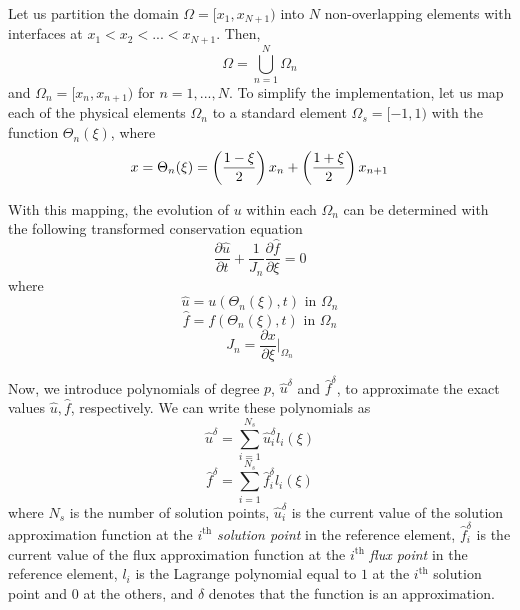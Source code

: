 Let us partition the domain $\Omega = [x_1,x_{N+1})$ into $N$ non-overlapping elements with 
interfaces at $x_1<x_2<...<x_{N+1}$. Then,
\begin{equation}
\Omega = \bigcup^N_{n=1} \Omega_n
\end{equation}
and $\Omega_n = [x_n,x_{n+1})$ for $n = 1,...,N$. To simplify the implementation, let us map each of the physical elements $\Omega_n$ to a standard element $\Omega_s=[-1,1)$ with the function $\Theta_n(\xi)$, where
\begin{equation}
x = \Theta_n(\xi) = \left( \frac{1-\xi}{2} \right) x_n + \left(\frac{1+\xi}{2}\right) x_{n+1} 
\end{equation}

With this mapping, the evolution of $u$ within each $\Omega_n$ can be determined with the following 
transformed conservation equation
\begin{equation}
\frac{\partial \hat{u}}{\partial t} + \frac{1}{J_n}\frac{\partial \hat{f}}{\partial \xi} = 0
\end{equation}
where
\begin{equation}
\hat{u} = u(\Theta_n(\xi),t) \text{ in } \Omega_n
\end{equation}
\begin{equation}
\hat{f} = f(\Theta_n(\xi),t) \text{ in } \Omega_n
\end{equation}
\begin{equation}
J_n = \frac{\partial x}{\partial \xi} \bigg|_{\Omega_n}
\end{equation}

Now, we introduce polynomials of degree $p$, $\hat{u}^\delta$ and $\hat{f}^\delta$, to approximate the exact values $\hat{u},\hat{f}$, respectively. We can write these polynomials as
\begin{equation}
\hat{u}^\delta = \sum_{i=1}^{N_s} \hat{u}_i^\delta l_i(\xi)
\end{equation}
\begin{equation}
\hat{f}^\delta = \sum_{i=1}^{N_s} \hat{f}_i^\delta l_i(\xi)
\end{equation}
where $N_s$ is the number of solution points, $\hat{u}_i^\delta$ is the current value of the 
solution approximation function at the $i^\text{th}$ \emph{solution point} in the reference element, 
$\hat{f}_i^\delta$ is the current value of the flux approximation function at the $i^\text{th}$ 
\emph{flux point} in the reference element, $l_i$ is the Lagrange polynomial equal to $1$ at the 
$i^\text{th}$ solution point and $0$ at the others, and $\delta$ denotes that the function is an 
approximation.

